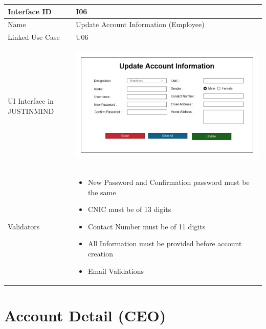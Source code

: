 \documentclass[12pt,a4paper]{report}
\begin{document}
\begin{tabular}{ | m{3cm} | m{12cm}| } \hline

Interface ID &  I06 \\\hline

Name  	      &  Update Account Information (Employee) \\ \hline

Linked Use Case & U06 \\ \hline

UI Interface in JUSTINMIND & \begin{center} \includegraphics[scale=0.3]{./User Interface/UI-005a Update Account Information.png}\end{center}  \\ \hline

Validators & 
\begin{itemize}
\item   New Password and Confirmation password must be the same
\item CNIC must be of 13 digits
\item Contact Number must be of 11 digits
\item All Information must be provided before account creation
\item Email Validations


\end{itemize}
\\ \hline

\end{tabular} 
\section{Account Detail (CEO) }
\end{document}
